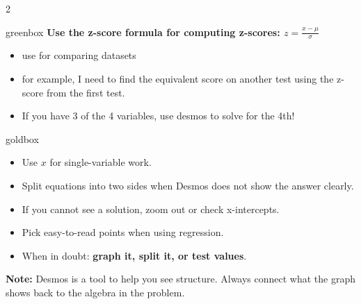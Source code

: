\documentclass[11pt]{article}
\begin{document}
\begin{multicols}{2}
\begin{skillbox}{greenbox}
\textbf{ Use the z-score formula for computing z-scores:  $z=\frac{x-\mu}{\sigma}$}
\begin{itemize}
  \item use for comparing datasets
  \item for example, I need to find the equivalent score on another test using the z-score from the first test.
  \item If you have 3 of the 4 variables, use desmos to solve for the 4th!
\end{itemize}
\end{skillbox}


\begin{skillbox}{goldbox}
\begin{itemize}
  \item Use \textbf{$x$} for single-variable work.
  \item Split equations into two sides when Desmos does not show the answer clearly.
  \item If you cannot see a solution, zoom out or check x-intercepts.
  \item Pick easy-to-read points when using regression.
  \item When in doubt: \textbf{graph it, split it, or test values}. 
\end{itemize}
\end{skillbox}

\end{multicols}

\vspace{0.4em}
{\small\textbf{Note:} Desmos is a tool to help you see structure. Always connect what the graph shows back to the algebra in the problem.}
\end{document}
